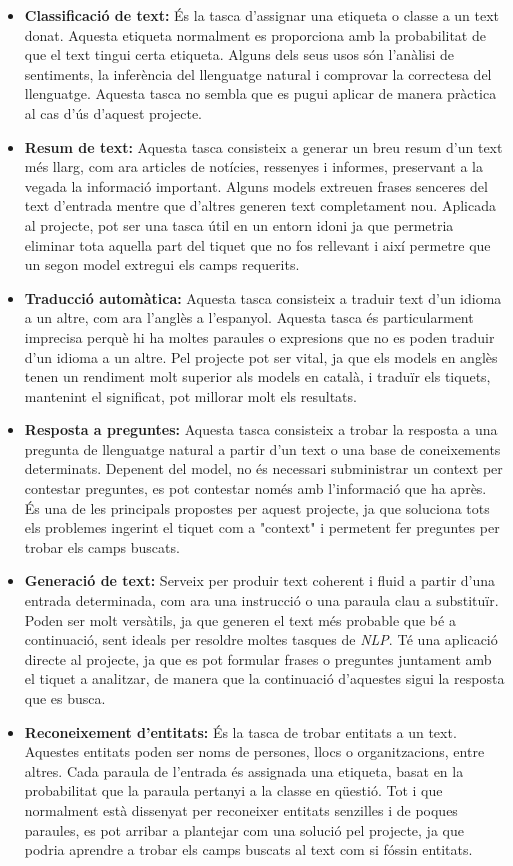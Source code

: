 \begin{itemize}
    \item \textbf{Classificació de text:} És la tasca d'assignar una etiqueta o classe a un text donat. Aquesta etiqueta normalment es proporciona amb la probabilitat de que el text tingui certa etiqueta. Alguns dels seus usos són l'anàlisi de sentiments, la inferència del llenguatge natural i comprovar la correctesa del llenguatge. Aquesta tasca no sembla que es pugui aplicar de manera pràctica al cas d'ús d'aquest projecte.
    \item \textbf{Resum de text:} Aquesta tasca consisteix a generar un breu resum d'un text més llarg, com ara articles de notícies, ressenyes i informes, preservant a la vegada la informació important. Alguns models extreuen frases senceres del text d'entrada mentre que d'altres generen text completament nou. Aplicada al projecte, pot ser una tasca útil en un entorn idoni ja que permetria eliminar tota aquella part del tiquet que no fos rellevant i així permetre que un segon model extregui els camps requerits.
    \item \textbf{Traducció automàtica:} Aquesta tasca consisteix a traduir text d'un idioma a un altre, com ara l'anglès a l'espanyol. Aquesta tasca és particularment imprecisa perquè hi ha moltes paraules o expresions que no es poden traduir d'un idioma a un altre. Pel projecte pot ser vital, ja que els models en anglès tenen un rendiment molt superior als models en català, i traduïr els tiquets, mantenint el significat, pot millorar molt els resultats.
    \item \textbf{Resposta a preguntes:} Aquesta tasca consisteix a trobar la resposta a una pregunta de llenguatge natural a partir d'un text o una base de coneixements determinats. Depenent del model, no és necessari subministrar un context per contestar preguntes, es pot contestar només amb l'informació que ha après. És una de les principals propostes per aquest projecte, ja que soluciona tots els problemes ingerint el tiquet com a "context" i permetent fer preguntes per trobar els camps buscats.
    \item \textbf{Generació de text:} Serveix per produir text coherent i fluid a partir d'una entrada determinada, com ara una instrucció o una paraula clau a substituïr. Poden ser molt versàtils, ja que generen el text més probable que bé a continuació, sent ideals per resoldre moltes tasques de \textit{NLP}. Té una aplicació directe al projecte, ja que es pot formular frases o preguntes juntament amb el tiquet a analitzar, de manera que la continuació d'aquestes sigui la resposta que es busca.
    \item \textbf{Reconeixement d'entitats:} És la tasca de trobar entitats a un text. Aquestes entitats poden ser noms de persones, llocs o organitzacions, entre altres. Cada paraula de l'entrada és assignada una etiqueta, basat en la probabilitat que la paraula pertanyi a la classe en qüestió. Tot i que normalment està dissenyat per reconeixer entitats senzilles i de poques paraules, es pot arribar a plantejar com una solució pel projecte, ja que podria aprendre a trobar els camps buscats al text com si fóssin entitats.
\end{itemize}
